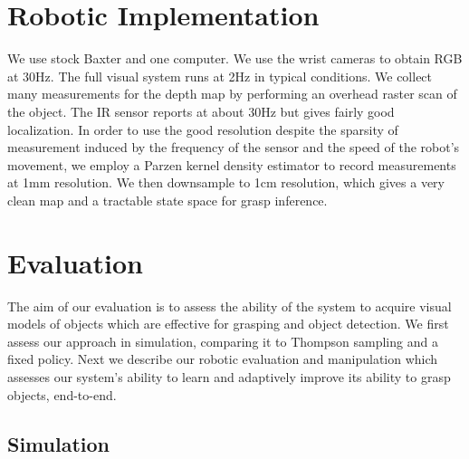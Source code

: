 \documentclass{article}
\begin{document}
\section{Robotic Implementation}

We use stock Baxter and one computer.  We use the wrist cameras to
obtain RGB at 30Hz.  The full visual system runs at 2Hz in typical
conditions.  We collect many measurements for the depth map by
performing an overhead raster scan of the object. The IR sensor
reports at about 30Hz but gives fairly good localization.  In order to
use the good resolution despite the sparsity of measurement induced by
the frequency of the sensor and the speed of the robot's movement, we
employ a Parzen kernel density estimator to record measurements at 1mm
resolution. We then downsample to 1cm resolution, which gives a very
clean map and a tractable state space for grasp inference.





 
\section{Evaluation}
\label{sec:evaluation}


The aim of our evaluation is to assess the ability of the system to
acquire visual models of objects which are effective for grasping and
object detection.  We first assess our approach in simulation,
comparing it to Thompson sampling and a fixed policy.  Next we
describe our robotic evaluation and manipulation which assesses our
system's ability to learn and adaptively improve its ability to grasp
objects, end-to-end.

\subsection{Simulation}
\end{document}
